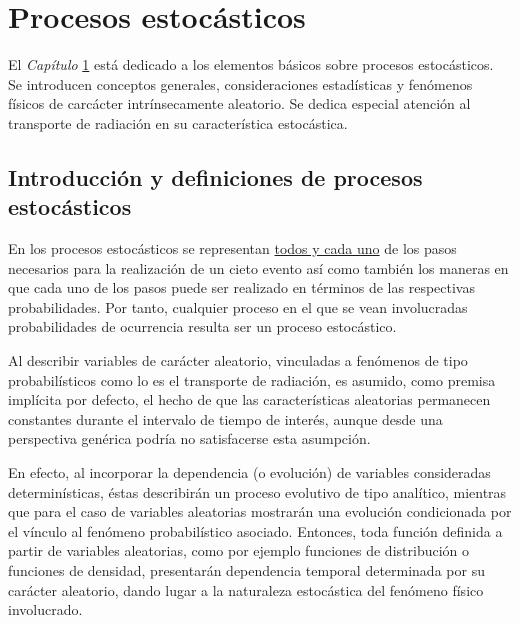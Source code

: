 \chapter{Procesos estoc\'asticos}
\label{CapVI}

El \textit{Cap\'itulo} \ref{CapVI} est\'a dedicado a los elementos b\'asicos sobre procesos estoc\'asticos. Se introducen conceptos generales, 
consideraciones estad\'isticas y fen\'omenos f\'isicos de carc\'acter intr\'insecamente aleatorio. Se dedica especial atenci\'on al 
transporte de radiaci\'on en su caracter\'istica estoc\'astica.

\section{Introducci\'on y definiciones de procesos estoc\'asticos}
\label{CapVI_1}

En los procesos estoc\'asticos se representan \underline{todos y cada uno} de los pasos necesarios para la realizaci\'on de un cieto evento 
as\'i como tambi\'en los maneras en que cada uno de los pasos puede ser realizado en t\'erminos de las respectivas probabilidades. 
%
Por tanto, cualquier proceso en el que se vean involucradas probabilidades de ocurrencia resulta ser un proceso estoc\'astico.

Al describir variables de car\'acter aleatorio, vinculadas a fen\'omenos de tipo probabil\'isticos como lo es el transporte de radiaci\'on, 
es asumido, como premisa impl\'icita por defecto, el hecho de que las caracter\'isticas aleatorias permanecen constantes durante el 
intervalo de tiempo de inter\'es, aunque desde una perspectiva gen\'erica podr\'ia no satisfacerse esta asumpci\'on.

En efecto, al incorporar la dependencia (o evoluci\'on) de variables consideradas determin\'isticas, \'estas describir\'an un proceso 
evolutivo de tipo anal\'itico, mientras que para el caso de variables aleatorias mostrar\'an una evoluci\'on condicionada por el v\'inculo
al fen\'omeno probabil\'istico asociado.
%
Entonces, toda funci\'on definida a partir de variables aleatorias, como por ejemplo funciones de distribuci\'on o funciones de densidad, 
presentar\'an dependencia temporal determinada por su car\'acter aleatorio, dando lugar a la naturaleza estoc\'astica del fen\'omeno f\'isico 
involucrado.

